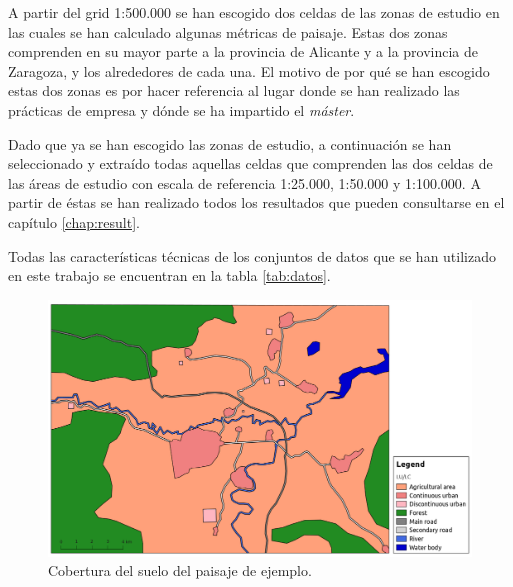 A partir del grid 1:500.000 se han escogido dos celdas de las zonas de estudio en las cuales se han calculado algunas métricas de paisaje. Estas dos zonas comprenden en su mayor parte a la provincia de Alicante y a la provincia de Zaragoza, y los alrededores de cada una. El motivo de por qué se han escogido estas dos zonas es por hacer referencia al lugar donde se han realizado las prácticas de empresa y dónde se ha impartido el \textit{máster}.

Dado que ya se han escogido las zonas de estudio, a continuación se han seleccionado y extraído todas aquellas celdas que comprenden las dos celdas de las áreas de estudio con escala de referencia 1:25.000, 1:50.000 y 1:100.000. A partir de éstas se han realizado todos los resultados que pueden consultarse en el capítulo \ref{chap:result}.

Todas las características técnicas de los conjuntos de datos que se han utilizado en este trabajo se encuentran en la tabla \ref{tab:datos}.

\begin{figure}
\begin{center}
\includegraphics[width=\textwidth]{Metodologia/Figs/zona_andrea.png}
\caption{Cobertura del suelo del paisaje de ejemplo. \label{fig:zona_andrea}}
\end{center}
\end{figure}


